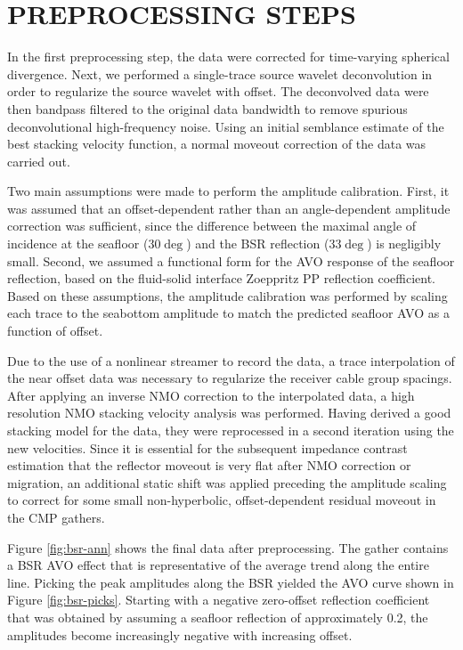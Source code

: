  
\section{PREPROCESSING STEPS}

In the first preprocessing step, the data were corrected for time-varying 
spherical divergence. Next, we performed a single-trace source wavelet 
deconvolution in order to regularize the source wavelet with offset. The
deconvolved data were then bandpass filtered to the original data bandwidth
to remove spurious deconvolutional high-frequency noise. Using an initial
semblance estimate of the best stacking velocity function, a normal moveout
correction of the data was carried out.
\par
Two main assumptions were made to perform the amplitude calibration. First, it
was assumed that an offset-dependent rather than an angle-dependent amplitude
correction was sufficient, since the difference between the maximal angle
of incidence at the seafloor (30$\deg$) and the BSR reflection (33$\deg$) is
negligibly small. Second, we assumed a functional form for the AVO response
of the seafloor reflection, based on the fluid-solid interface Zoeppritz
PP reflection 
coefficient. Based on these assumptions, the amplitude calibration was
performed by scaling each trace to the seabottom amplitude to match the 
predicted seafloor AVO as a function of offset.
\par
Due to the use of a nonlinear streamer to record the data, a trace 
interpolation of the near offset data was necessary to regularize the receiver
cable group spacings. After applying an inverse NMO correction to the
interpolated data, a high resolution NMO stacking velocity analysis was
performed. Having derived a good stacking model for the data, they were
reprocessed in a second iteration using the new velocities. Since it is 
essential for the subsequent impedance contrast estimation that the reflector
moveout is very flat after NMO correction or migration, an additional 
static shift was applied preceding the amplitude scaling to correct for some
small non-hyperbolic, offset-dependent residual moveout in the CMP gathers.
\par
Figure \ref{fig:bsr-ann} shows the final data after preprocessing. 
The gather contains a BSR AVO effect that is representative of the average 
trend along the entire line. Picking the peak amplitudes along the BSR yielded
the AVO curve shown in Figure \ref{fig:bsr-picks}. Starting with a negative 
zero-offset reflection coefficient that was obtained by assuming a seafloor
reflection of approximately 0.2, the amplitudes become increasingly negative
with increasing offset.


